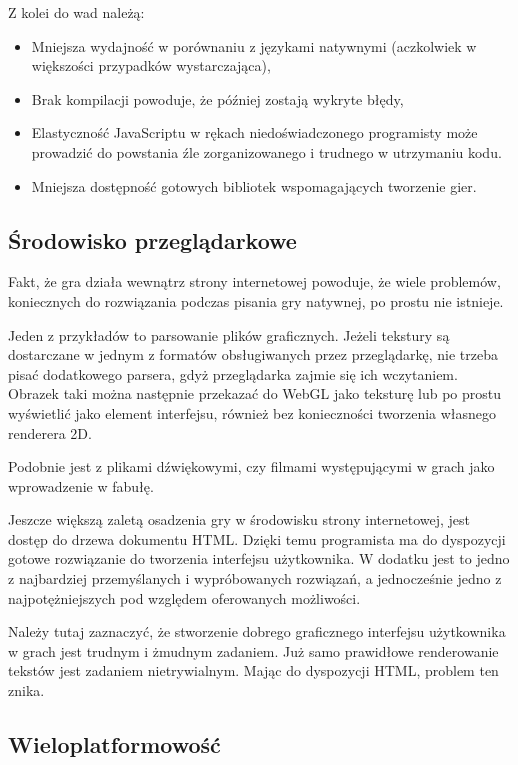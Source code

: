 Z kolei do wad należą:
\begin{itemize}
\item Mniejsza wydajność w porównaniu z językami natywnymi (aczkolwiek w większości przypadków
  wystarczająca),
\item Brak kompilacji powoduje, że później zostają wykryte błędy,
\item Elastyczność JavaScriptu w rękach niedoświadczonego programisty może prowadzić
  do powstania źle zorganizowanego i trudnego w utrzymaniu kodu.
\item Mniejsza dostępność gotowych bibliotek wspomagających tworzenie gier.
\end{itemize}

\subsection{Środowisko przeglądarkowe}

Fakt, że gra działa wewnątrz strony internetowej powoduje, że wiele problemów, koniecznych
do rozwiązania podczas pisania gry natywnej, po prostu nie istnieje.

Jeden z przykładów to parsowanie plików graficznych. Jeżeli tekstury są dostarczane w jednym
z formatów obsługiwanych przez przeglądarkę, nie trzeba pisać dodatkowego parsera, gdyż
przeglądarka zajmie się ich wczytaniem. Obrazek taki można następnie przekazać do WebGL
jako teksturę lub po prostu wyświetlić jako element interfejsu, również bez konieczności
tworzenia własnego renderera 2D.

Podobnie jest z plikami dźwiękowymi, czy filmami występującymi w grach jako wprowadzenie
w fabułę.

Jeszcze większą zaletą osadzenia gry w środowisku strony internetowej, jest dostęp do
drzewa dokumentu HTML. Dzięki temu programista ma do dyspozycji gotowe rozwiązanie
do tworzenia interfejsu użytkownika. W dodatku jest to jedno z najbardziej przemyślanych
i wypróbowanych rozwiązań, a jednocześnie jedno z najpotężniejszych pod względem oferowanych
możliwości.

Należy tutaj zaznaczyć, że stworzenie dobrego graficznego interfejsu użytkownika w grach jest
trudnym i żmudnym zadaniem. Już samo prawidłowe renderowanie tekstów jest zadaniem nietrywialnym.
Mając do dyspozycji HTML, problem ten znika.

\subsection{Wieloplatformowość}

